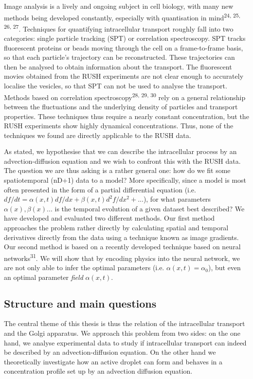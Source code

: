 \documentclass{Dissertate}
\begin{document}
Image analysis is a lively and ongoing subject in cell biology, with
many new methods being developed constantly, especially with
quantisation in
mind\textsuperscript{24, 25, 26, 27}.
Techniques for quantifying intracellular transport roughly fall into two
categories: single particle tracking (SPT) or correlation spectroscopy.
SPT tracks fluorescent proteins or beads moving through the cell on a
frame-to-frame basis, so that each particle's trajectory can be
reconstructed. These trajectories can then be analysed to obtain
information about the transport. The fluorescent movies obtained from
the RUSH experiments are not clear enough to accurately localise the
vesicles, so that SPT can not be used to analyse the transport. Methods
based on correlation
spectroscopy\textsuperscript{28, 29, 30} rely on a general relationship between the fluctuations and the
underlying density of particles and transport properties. These
techniques thus require a nearly constant concentration, but the RUSH
experiments show highly dynamical concentrations. Thus, none of the techniques we found
are directly applicable to the RUSH data.

As stated, we hypothesise that we can describe the intracellular process
by an advection-diffusion equation and we wish to confront this with the
RUSH data. The question we are thus asking is a rather general one: how
do we fit some spatiotemporal (nD+1) data to a model? More specifically,
since a model is most often presented in the form of a partial
differential equation (i.e.
\(df/dt = \alpha(x, t) df/dx+\beta(x, t) d^2f/dx^2+...\)), for what parameters
\(\alpha(x), \beta(x)...\) is the temporal evolution of a given dataset best
described? We have developed and evaluated two different methods. Our
first method approaches the problem rather directly by calculating
spatial and temporal derivatives directly from the data using a
technique known as image gradients. Our second method is based on a
recently developed technique based on neural
networks\textsuperscript{31}. We will show that by encoding physics into
the neural network, we are not only able to infer the optimal
parameters (i.e. $\alpha(x,t)=\alpha_0$), but even an optimal parameter \emph{field} $\alpha(x,t)$.

\hypertarget{structure-and-main-questions}{%
\subsection{Structure and main
questions}\label{structure-and-main-questions}}
The central theme of this thesis is thus the relation of the intracellular transport and the Golgi apparatus. We approach this problem from two sides: on the one hand, we analyse experimental data to study if intracellular transport can indeed be described by an advection-diffusion equation. On the other hand we theoretically investigate how an active droplet can form and behaves in a concentration profile set up by an advection diffusion equation.
\end{document}
